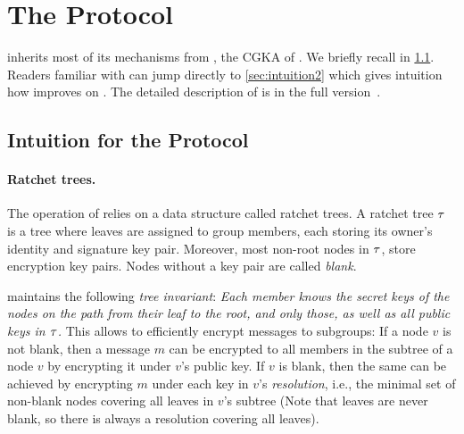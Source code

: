 
\section{The \saik Protocol}\label{sec:saik}
\saik inherits most of its mechanisms from \protITK, the CGKA of \mls. We briefly recall \protITK in
\cref{sec:intuition1}.
Readers familiar with \protITK can jump directly to \cref{sec:intuition2} which gives intuition how \saik improves on
\protITK. The detailed description of \saik is in the full version~\cite{EPRINT:AHKM21}.

\subsection{Intuition for the \protITK Protocol}\label{sec:intuition1}

\paragraph{Ratchet trees.}
The operation of \protITK relies on a data structure called ratchet trees. A ratchet tree $\tau$ is a tree where leaves are assigned to group members, each storing its owner's identity and signature key pair. Moreover, most non-root nodes in $\tau$, store encryption key pairs. Nodes without a key pair are called \emph{blank}.

\protITK maintains the following \emph{tree invariant}:
  {\it Each member knows the secret keys of the nodes on the path from their leaf to the root, and only those, as well as all public keys in $\tau$.}
This allows to efficiently encrypt messages to subgroups: If a node $v$ is not blank, then a message $m$ can be
encrypted to all members in the subtree of a node $v$ by encrypting it under $v$'s public key. If $v$ is blank, then the
same can be achieved by encrypting $m$ under each key in $v$'s \emph{resolution}, i.e., the minimal set of non-blank
nodes covering all leaves in $v$'s subtree (Note that leaves are never blank, so there is always a resolution covering
all leaves).


